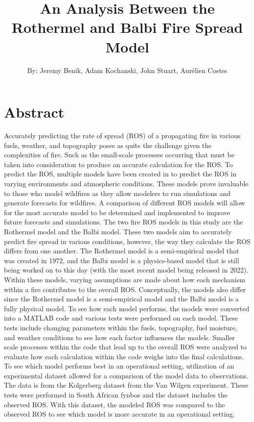 \documentclass{article}
\begin{document}
\title{An Analysis Between the Rothermel and Balbi Fire Spread Model}
\author{By: Jeremy Benik, Adam Kochanski, John Stuart, Aurélien Costes}
\maketitle
\section{Abstract}
Accurately predicting the rate of spread (ROS) of a propagating fire in various fuels, weather, and topography poses as quite the challenge given the complexities of fire. Such as the small-scale processes occurring that must be taken into consideration to produce an accurate calculation for the ROS. To predict the ROS, multiple models have been created in to predict the ROS in varying environments and atmospheric conditions. These models prove invaluable to those who model wildfires as they allow modelers to run simulations and generate forecasts for wildfires. A comparison of different ROS models will allow for the most accurate model to be determined and implemented to improve future forecasts and simulations. The two fire ROS models in this study are the Rothermel model and the Balbi model. These two models aim to accurately predict fire spread in various conditions, however, the way they calculate the ROS differs from one another. The Rothermel model is a semi-empirical model that was created in 1972, and the Balbi model is a physics-based model that is still being worked on to this day (with the most recent model being released in 2022). Within these models, varying assumptions are made about how each mechanism within a fire contributes to the overall ROS. Conceptually, the models also differ since the Rothermel model is a semi-empirical model and the Balbi model is a fully physical model. To see how each model performs, the models were converted into a MATLAB code and various tests were performed on each model. These tests include changing parameters within the fuels, topography, fuel moisture, and weather conditions to see how each factor influences the models. Smaller scale processes within the code that lead up to the overall ROS were analyzed to evaluate how each calculation within the code weighs into the final calculations.  \\
\indent To see which model performs best in an operational setting, utilization of an experimental dataset allowed for a comparison of the model data to observations. The data is from the Kolgerberg dataset from the Van Wilgen experiment. These tests were performed in South African fynbos and the dataset includes the observed ROS. With this dataset, the modeled ROS was compared to the observed ROS to see which model is more accurate in an operational setting.
\end{document}
